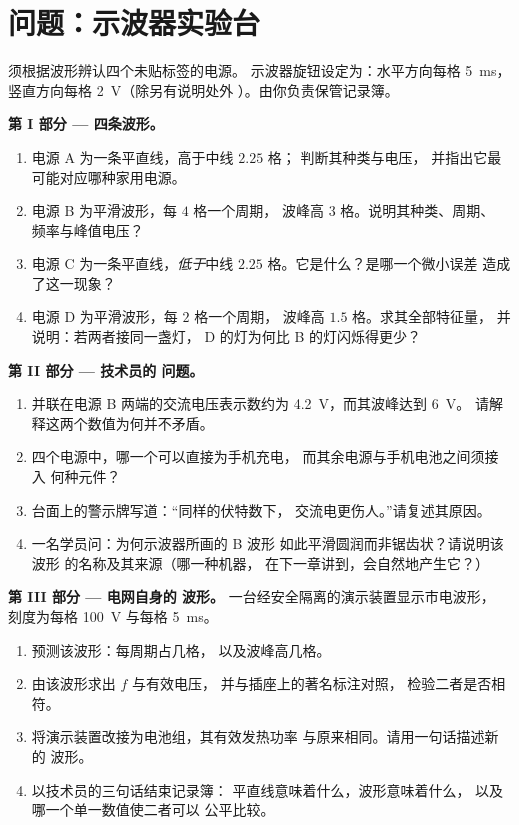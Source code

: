 \section{问题：示波器实验台}

\begin{problem}\label{pb:g9:alternating-current:1}
须根据波形辨认四个未贴标签的电源。
示波器旋钮设定为：水平方向每格 \qty{5}{ms}，
竖直方向每格 \qty{2}{V}（除另有说明处外
）。由你负责保管记录簿。

\medskip\noindent\textbf{第 I 部分 --- 四条波形。}
\begin{enumerate}
  \item 电源 A 为一条平直线，高于中线 $2.25$ 格；
        判断其种类与电压，
        并指出它最可能对应哪种家用电源。
  \item 电源 B 为平滑波形，每 $4$ 格一个周期，
        波峰高 $3$ 格。说明其种类、周期、
        频率与峰值电压？
  \item 电源 C 为一条平直线，\emph{低于}中线
        $2.25$ 格。它是什么？是哪一个微小误差
        造成了这一现象？
  \item 电源 D 为平滑波形，每 $2$ 格一个周期，
        波峰高 $1.5$ 格。求其全部特征量，
        并说明：若两者接同一盏灯，
        D 的灯为何比 B 的灯闪烁得更少？
\end{enumerate}

\medskip\noindent\textbf{第 II 部分 --- 技术员的
问题。}
\begin{enumerate}[resume]
  \item 并联在电源 B 两端的交流电压表示数约为
        \qty{4.2}{V}，而其波峰达到 \qty{6}{V}。
        请解释这两个数值为何并不矛盾。
  \item 四个电源中，哪一个可以直接为手机充电，
        而其余电源与手机电池之间须接入
        何种元件？
  \item 台面上的警示牌写道：“同样的伏特数下，
        交流电更伤人。”请复述其原因。
  \item 一名学员问：为何示波器所画的 B 波形
        如此平滑圆润而非锯齿状？请说明该波形
        的名称及其来源（哪一种机器，
        在下一章讲到，会自然地产生它？）
\end{enumerate}

\medskip\noindent\textbf{第 III 部分 --- 电网自身的
波形。}
一台经安全隔离的演示装置显示市电波形，
刻度为每格 \qty{100}{V} 与每格 \qty{5}{ms}。
\begin{enumerate}[resume]
  \item 预测该波形：每周期占几格，
        以及波峰高几格。
  \item 由该波形求出 $f$ 与有效电压，
        并与插座上的著名标注对照，
        检验二者是否相符。
  \item 将演示装置改接为电池组，其有效发热功率
        与原来相同。请用一句话描述新的
        波形。
  \item 以技术员的三句话结束记录簿：
        平直线意味着什么，波形意味着什么，
        以及哪一个单一数值使二者可以
        公平比较。
\end{enumerate}
\end{problem}
